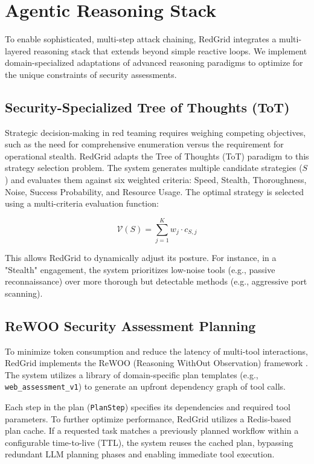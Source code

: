 \documentclass[conference,compsoc]{IEEEtran}
\begin{document}
\section{Agentic Reasoning Stack} \label{sec:reasoning}
To enable sophisticated, multi-step attack chaining, RedGrid integrates a multi-layered reasoning stack that extends beyond simple reactive loops. We implement domain-specialized adaptations of advanced reasoning paradigms to optimize for the unique constraints of security assessments.

\subsection{Security-Specialized Tree of Thoughts (ToT)}
Strategic decision-making in red teaming requires weighing competing objectives, such as the need for comprehensive enumeration versus the requirement for operational stealth. RedGrid adapts the Tree of Thoughts (ToT) \cite{tot} paradigm to this strategy selection problem. The system generates multiple candidate strategies ($S$) and evaluates them against six weighted criteria: Speed, Stealth, Thoroughness, Noise, Success Probability, and Resource Usage. The optimal strategy is selected using a multi-criteria evaluation function:

\begin{equation}
\mathcal{V}(S) = \sum_{j=1}^{K} w_j \cdot c_{S,j}
\end{equation}

This allows RedGrid to dynamically adjust its posture. For instance, in a "Stealth" engagement, the system prioritizes low-noise tools (e.g., passive reconnaissance) over more thorough but detectable methods (e.g., aggressive port scanning).

\subsection{ReWOO Security Assessment Planning}
To minimize token consumption and reduce the latency of multi-tool interactions, RedGrid implements the ReWOO (Reasoning WithOut Observation) framework \cite{rewoo}. The system utilizes a library of domain-specific plan templates (e.g., \texttt{web\_assessment\_v1}) to generate an upfront dependency graph of tool calls.

Each step in the plan (\texttt{PlanStep}) specifies its dependencies and required tool parameters. To further optimize performance, RedGrid utilizes a Redis-based plan cache. If a requested task matches a previously planned workflow within a configurable time-to-live (TTL), the system reuses the cached plan, bypassing redundant LLM planning phases and enabling immediate tool execution.
\end{document}
